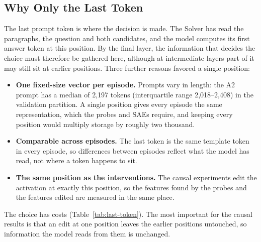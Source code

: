 \subsection{Why Only the Last Token}

The last prompt token is where the decision is made. The Solver has read the
paragraphs, the question and both candidates, and the model computes its first
answer token at this position. By the final layer, the information that
decides the choice must therefore be gathered here, although at intermediate
layers part of it may still sit at earlier positions. Three further reasons
favored a single position:
\begin{itemize}
    \item \textbf{One fixed-size vector per episode.} Prompts vary in length:
    the A2 prompt has a median of 2,197 tokens (interquartile range
    2,018--2,408) in the validation partition. A single position gives every
    episode the same representation, which the probes and SAEs require, and
    keeping every position would multiply storage by roughly two thousand.
    \item \textbf{Comparable across episodes.} The last token is the same
    template token in every episode, so differences between episodes reflect
    what the model has read, not where a token happens to sit.
    \item \textbf{The same position as the interventions.} The causal
    experiments edit the activation at exactly this position, so the features
    found by the probes and the features edited are measured in the same
    place.
\end{itemize}

The choice has costs (Table~\ref{tab:last-token}). The most important for the
causal results is that an edit at one position leaves the earlier positions
untouched, so information the model reads from them is unchanged.

